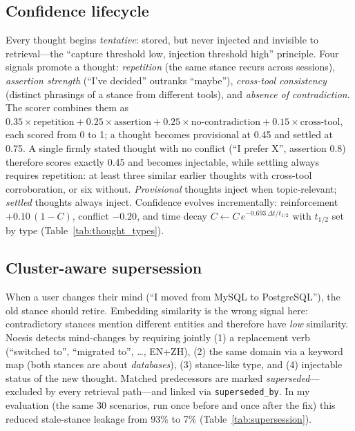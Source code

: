 \documentclass[11pt]{article}
\begin{document}
\subsection{Confidence lifecycle}
\label{sec:lifecycle}

Every thought begins \emph{tentative}: stored, but never injected and
invisible to retrieval---the ``capture threshold low, injection threshold
high'' principle. Four signals promote a thought: \emph{repetition} (the
same stance recurs across sessions), \emph{assertion strength} (``I've
decided'' outranks ``maybe''), \emph{cross-tool consistency} (distinct
phrasings of a stance from different tools), and \emph{absence of
contradiction}. The scorer combines them as
$0.35 \times \text{repetition} + 0.25 \times \text{assertion} + 0.25 \times
\text{no-contradiction} + 0.15 \times \text{cross-tool}$, each scored from 0
to 1; a thought becomes provisional at 0.45 and settled at 0.75. A single
firmly stated thought with no conflict (``I prefer X'', assertion 0.8)
therefore scores exactly 0.45 and becomes injectable, while settling always
requires repetition: at least three similar earlier thoughts with cross-tool
corroboration, or six without. \emph{Provisional} thoughts inject when
topic-relevant; \emph{settled} thoughts always inject. Confidence evolves
incrementally: reinforcement $+0.10\,(1-C)$, conflict $-0.20$, and time decay
$C \leftarrow C\, e^{-0.693\,\Delta t / t_{1/2}}$ with $t_{1/2}$ set by type
(Table~\ref{tab:thought_types}).

\subsection{Cluster-aware supersession}
\label{sec:supersession}

When a user changes their mind (``I moved from MySQL to PostgreSQL''), the
old stance should retire. Embedding similarity is the wrong signal here:
contradictory stances mention different entities and therefore have
\emph{low} similarity. Noesis detects mind-changes by requiring jointly (1)
a replacement verb (``switched to'', ``migrated to'', \ldots, EN+ZH), (2)
the same domain via a keyword map (both stances are about \emph{databases}),
(3) stance-like type, and (4) injectable status of the new thought.
Matched predecessors are marked \emph{superseded}---excluded by every
retrieval path---and linked via \texttt{superseded\_by}. In my evaluation
(the same 30 scenarios, run once before and once after the fix) this reduced
stale-stance leakage from 93\% to 7\% (Table~\ref{tab:supersession}).
\end{document}
